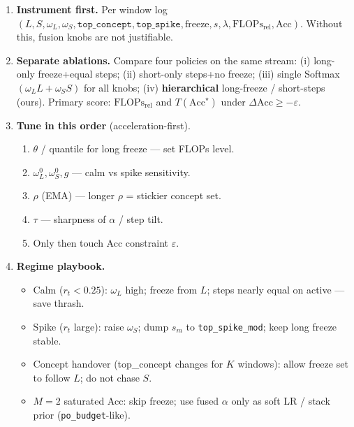 \documentclass[11pt]{article}
\newcommand{\Acc}{\mathrm{Acc}}
\newcommand{\Flops}{\mathrm{FLOPs}_{\mathrm{rel}}}
\begin{document}
\begin{enumerate}[leftmargin=1.4em,itemsep=3pt]
  \item \textbf{Instrument first.}
        Per window log
        $(L,S,\omega_L,\omega_S,\texttt{top\_concept},\texttt{top\_spike},
        \mathrm{freeze},s,\lambda,\Flops,\Acc)$.
        Without this, fusion knobs are not justifiable.

  \item \textbf{Separate ablations.}
        Compare four policies on the same stream:
        (i) long-only freeze+equal steps;
        (ii) short-only steps+no freeze;
        (iii) single Softmax$(\omega_L L+\omega_S S)$ for all knobs;
        (iv) \textbf{hierarchical} long-freeze / short-steps (ours).
        Primary score: $\Flops$ and $T(\Acc^\star)$ under $\Delta\Acc\ge-\varepsilon$.

  \item \textbf{Tune in this order} (acceleration-first).
        \begin{enumerate}[label=\alph*.,leftmargin=1.2em]
          \item $\theta$ / quantile for long freeze --- set FLOPs level.
          \item $\omega_L^{0},\omega_S^{0},g$ --- calm vs spike sensitivity.
          \item $\rho$ (EMA) --- longer $\rho$ = stickier concept set.
          \item $\tau$ --- sharpness of $\alpha$ / step tilt.
          \item Only then touch Acc constraint $\varepsilon$.
        \end{enumerate}

  \item \textbf{Regime playbook.}
        \begin{itemize}[leftmargin=1em,itemsep=1pt]
          \item Calm ($r_t{<}0.25$): $\omega_L$ high; freeze from $L$;
                steps nearly equal on active --- save thrash.
          \item Spike ($r_t$ large): raise $\omega_S$; dump $s_m$ to
                \texttt{top\_spike\_mod}; keep long freeze stable.
          \item Concept handover (top\_concept changes for $K$ windows):
                allow freeze set to follow $L$; do not chase $S$.
          \item $M{=}2$ saturated Acc: skip freeze; use fused $\alpha$
                only as soft LR / stack prior (\texttt{po\_budget}-like).
        \end{itemize}


\end{enumerate}
\end{document}
